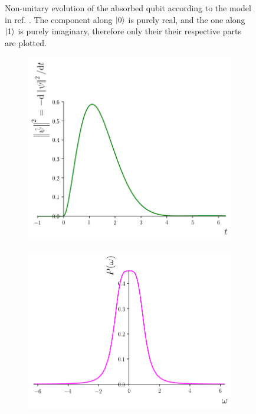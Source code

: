 \begin{figure}
\begin{subfigure}{0.49\textwidth}
    \subcaption{}\label{fig:absorbed-qubit-components:im1}
  \end{subfigure}
  \caption{
    Non-unitary evolution of the absorbed qubit
    according to the model in
    ref. \cite[\S ``Emission from a two-level system'']{RuschhauptAbsorption}.
    The component along $\ket{0}$ is purely real,
    and the one along $\ket{1}$ is purely imaginary,
    therefore only their their respective parts are plotted.
  }\label{fig:absorbed-qubit-components}
\end{figure}

\begin{figure}
  \centering
  \begin{subfigure}[b]{0.49\textwidth}
    \includegraphics[width=\linewidth]{img/2ldetect/qubit_normalization_loss.png}
    \subcaption{}\label{fig:absorbed-qubit-normalization-loss:t}
  \end{subfigure}
  \begin{subfigure}[b]{0.49\textwidth}
    \includegraphics[width=\linewidth]{img/2ldetect/P_omega.png}

\end{subfigure}
\end{figure}
